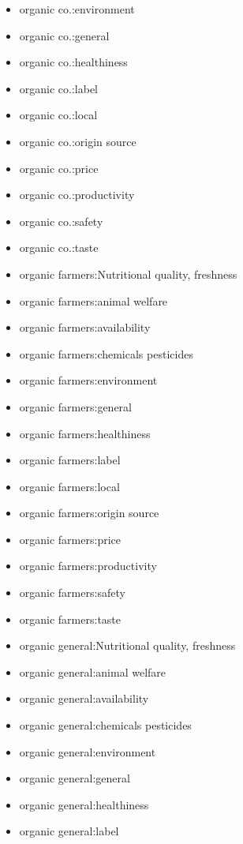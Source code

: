 \begin{multicols}{2}
\begin{itemize}[leftmargin=*]
        \item[] organic co.:environment 
        \item[] organic co.:general 
        \item[] organic co.:healthiness 
        \item[] organic co.:label
        \item[] organic co.:local
        \item[] organic co.:origin source
        \item[] organic co.:price
        \item[] organic co.:productivity 
        \item[] organic co.:safety
        \item[] organic co.:taste
        \item[] organic farmers:Nutritional quality, freshness 
        \item[] organic farmers:animal welfare 
        \item[] organic farmers:availability
        \item[] organic farmers:chemicals pesticides
        \item[] organic farmers:environment
        \item[] organic farmers:general
        \item[] organic farmers:healthiness
        \item[] organic farmers:label 
        \item[] organic farmers:local 
        \item[] organic farmers:origin source 
        \item[] organic farmers:price 
        \item[] organic farmers:productivity
        \item[] organic farmers:safety 
        \item[] organic farmers:taste 
        \item[] organic general:Nutritional quality, freshness 
        \item[] organic general:animal welfare 
        \item[] organic general:availability
        \item[] organic general:chemicals pesticides
        \item[] organic general:environment
        \item[] organic general:general
        \item[] organic general:healthiness
        \item[] organic general:label 

\end{itemize}
\end{multicols}
